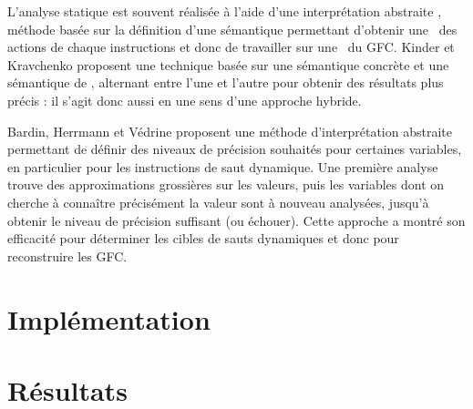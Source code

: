 L'analyse statique est souvent réalisée à l'aide d'une interprétation abstraite \cite{CousotC77}, méthode basée sur la définition d'une sémantique permettant d'obtenir une \sura\ des actions de chaque instructions et donc de travailler sur une \sura\ du GFC.
Kinder et Kravchenko \cite{jakstab-alternating} proposent une technique basée sur une sémantique concrète et une sémantique de \sura, alternant entre l'une et l'autre pour obtenir des résultats plus précis : il s'agit donc aussi en une sens d'une approche hybride.

Bardin, Herrmann et Védrine \cite{BHV11} proposent une méthode d'interprétation abstraite permettant de définir des niveaux de précision souhaités pour certaines variables, en particulier pour les instructions de saut dynamique. 
Une première analyse trouve des approximations grossières sur les valeurs, puis les variables dont on cherche à connaître précisément la valeur sont à nouveau analysées, jusqu'à obtenir le niveau de précision suffisant (ou échouer).
Cette approche a montré son efficacité pour déterminer les cibles de sauts dynamiques et donc pour reconstruire les GFC.


\section{Implémentation}

\section{Résultats}